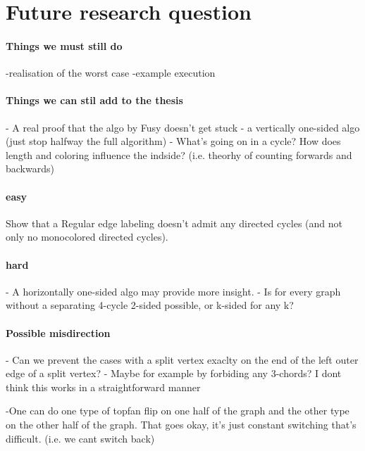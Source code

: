 \section{Future research question}

\paragraph{Things we must still do}
-realisation of the worst case
-example execution


\paragraph{Things we can stil add to the thesis}
- A real proof that the algo by Fusy doesn't get stuck
- a vertically one-sided algo (just stop halfway the full algorithm)
- What's going on in a cycle? How does length and coloring influence the indside? (i.e. theorhy of counting forwards and backwards)

\paragraph{easy}
Show that a Regular edge labeling doesn't admit any directed cycles (and not only no monocolored directed cycles).

\paragraph{hard}
- A horizontally one-sided algo may provide more insight.
- Is for every graph without a separating 4-cycle 2-sided possible, or k-sided for any k?

\paragraph{Possible misdirection}
- Can we prevent the cases with a split vertex exaclty on the end of the left outer edge of a split vertex?
      - Maybe for example by forbiding any 3-chords? I dont think this works in a straightforward manner

-One can do one type of topfan flip on one half of the graph and the other type on the other half of the graph. That goes okay, it's just constant switching that's difficult. (i.e. we cant switch back)
